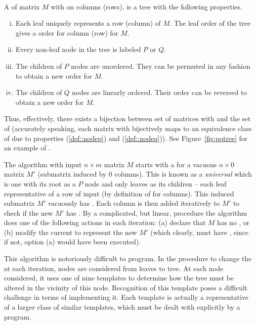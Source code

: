 \begin{definition}\\
  A \PQtree of matrix $M$ with \COP on columns (rows), is a tree with the following properties.
  \begin{enumerate}[i.]
    \singlespacing
  \item Each leaf uniquely represents a row (column) of $M$. The leaf
    order of the tree gives a \COP order for column (row) for $M$.
  \item Every non-leaf node in the tree is labeled $P$ or $Q$.
  \item \label{def::nodep} The children of $P$ nodes are
    unordered. They can be permuted in any fashion to obtain a new
    \COP order for $M$.
  \item \label{def::nodeq} The children of $Q$ nodes are linearly
    ordered. Their order can be reversed to obtain a new \COP
    order for $M$.
  \end{enumerate}
  \label{def:pqtree}
\end{definition}

Thus, effectively, there exists a bijection between set of matrices
with \COP and the set of \PQtrees (accurately speaking, each matrix
with \COP bijectively maps to an equivalence class of \PQtrees due to
properties (\ref{def::nodep}) and (\ref{def::nodeq})). See
Figure~\ref{fig:pqtree} for an example of \PQtree.

\figpqtree

The \cite{bl76} algorithm with input $n \times m$ matrix $M$ starts
with a \PQtree for a vacuous $n \times 0$ matrix $M'$ (submatrix
induced by 0 columns). This is known as a {\em universal} \PQtree
which is one with its root as a $P$ node and only leaves as its
children -- each leaf representative of a row of input (by definition
of \COP for columns). This induced submatrix $M'$ vacuously has \COP.
Each column is then added iteratively to $M'$ to check if the new $M'$
has \COP.  By a complicated, but linear, procedure the algorithm does
one of the following actions in each iteration: (a) declare that $M$
has no \COP, or (b) modify the current \PQtree to represent the new
$M'$ (which clearly, must have \COP, since if not, option (a) would
have been executed).


This algorithm is notoriously difficult to program. In the procedure
to change the \PQtree at each iteration, nodes are considered from
leaves to tree. At each node considered, it uses one of nine templates
to determine how the tree must be altered in the vicinity of this
node. Recognition of this template poses a difficult challenge in
terms of implementing it. Each template is actually a representative
of a larger class of similar templates, which must be dealt with
explicitly by a program\cite{mcc04}.


